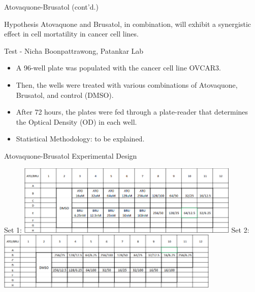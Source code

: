 \documentclass{beamer}
\begin{document}
\begin{frame}{Atovaquone-Brusatol (cont'd.)}

    \begin{block}{Hypothesis}
        Atovaquone and Brusatol, in combination, will exhibit a synergistic effect in cell mortatility in cancer cell lines.
    \end{block}

    \vfill
    \begin{block}{Test - Nicha Boonpattrawong, Patankar Lab}
        \begin{itemize}
            \item A 96-well plate was populated with the cancer cell line OVCAR3.
            \item Then, the wells were treated with various combinations of Atovaquone, Brusatol, and control (DMSO).
            \item After 72 hours, the plates were fed through a plate-reader that determines the Optical Density (OD) in each well.
            \item Statistical Methodology: to be explained.
        \end{itemize}
    \end{block}

\end{frame}

\begin{frame}{Atovaquone-Brusatol Experimental Design}
    \begin{center}
        Set 1: \includegraphics[width=0.8\textwidth, height=0.4\textheight]{figs/set1.png}
        \vfill
        Set 2: \includegraphics[width=0.8\textwidth, height=0.4\textheight]{figs/set2.png}
    \end{center}
\end{frame}
\end{document}
